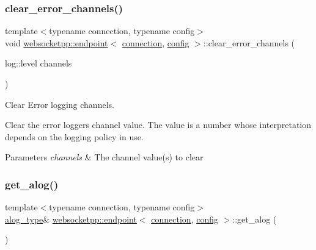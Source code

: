 \subsubsection{\texorpdfstring{clear\+\_\+error\+\_\+channels()}{clear\_error\_channels()}}
{\footnotesize\ttfamily template$<$typename connection, typename config$>$ \\
void \mbox{\hyperlink{classwebsocketpp_1_1endpoint}{websocketpp\+::endpoint}}$<$ \mbox{\hyperlink{classwebsocketpp_1_1connection}{connection}}, \mbox{\hyperlink{classconfig}{config}} $>$\+::clear\+\_\+error\+\_\+channels (\begin{DoxyParamCaption}\item[{log\+::level}]{channels }\end{DoxyParamCaption})\hspace{0.3cm}{\ttfamily [inline]}}



Clear Error logging channels. 

Clear the error logger\textquotesingle{}s channel value. The value is a number whose interpretation depends on the logging policy in use.


\begin{DoxyParams}{Parameters}
{\em channels} & The channel value(s) to clear \\
\hline
\end{DoxyParams}
\mbox{\label{classwebsocketpp_1_1endpoint_a1607d873b9e764c02563162f03171326}} 
\subsubsection{\texorpdfstring{get\+\_\+alog()}{get\_alog()}}
{\footnotesize\ttfamily template$<$typename connection, typename config$>$ \\
\mbox{\hyperlink{classwebsocketpp_1_1endpoint_a1ca2ad5bfdd241a031746c3f158f4003}{alog\+\_\+type}}\& \mbox{\hyperlink{classwebsocketpp_1_1endpoint}{websocketpp\+::endpoint}}$<$ \mbox{\hyperlink{classwebsocketpp_1_1connection}{connection}}, \mbox{\hyperlink{classconfig}{config}} $>$\+::get\+\_\+alog (\begin{DoxyParamCaption}{ }\end{DoxyParamCaption})\hspace{0.3cm}{\ttfamily [inline]}}



